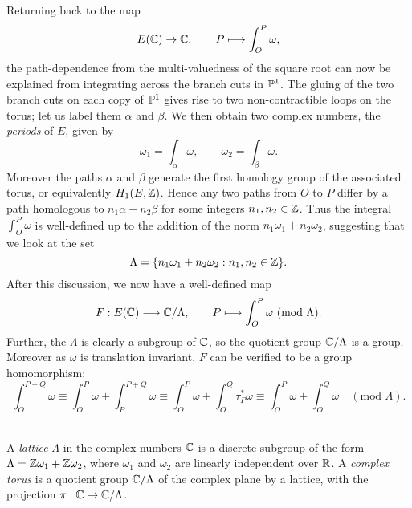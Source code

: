 Returning back to the map
\begin{equation*}
E(\mathbb{C}) \rightarrow \mathbb{C},\qquad P \longmapsto \int_{O}^{P}\omega,
\end{equation*}
the path-dependence from the multi-valuedness of the square root can now be explained from integrating across the branch cuts in $\mathbb{P}^{1}$. The gluing of the two branch cuts on each copy of $\mathbb{P}^{1}$ gives rise to two non-contractible loops on the torus; let us label them $\alpha$ and $\beta$. We then obtain two complex numbers, the \emph{periods} of $E$, given by
\begin{equation*}
	\omega_{1} = \int_{\alpha}\omega,\qquad \omega_{2} = \int_{\beta}\omega.
\end{equation*}
Moreover the paths $\alpha$ and $\beta$ generate the first homology group of the associated torus, or equivalently $H_{1}(E,\mathbb{Z})$. Hence any two paths from $O$ to $P$ differ by a path homologous to $n_{1}\alpha + n_{2}\beta$ for some integers $n_{1}, n_{2}\in \mathbb{Z}$. Thus the integral $\int_{O}^{P}\omega$ is well-defined up to the addition of the norm $n_{1}\omega_{1} + n_{2}\omega_{2}$, suggesting that we look at the set
\begin{equation*}
	\Lambda = \{n_{1}\omega_{1} + n_{2}\omega_{2}: n_{1}, n_{2}\in \mathbb{Z}\}.
\end{equation*}
After this discussion, we now have a well-defined map
\begin{equation*}
	F: E(\mathbb{C}) \longrightarrow \mathbb{C}/\Lambda,\qquad P \longmapsto \int_{O}^{P}\omega\ (\text{mod }\Lambda).
\end{equation*}
Further, the $\Lambda$ is clearly a subgroup of $\mathbb{C}$, so the quotient group $\mathbb{C}/\Lambda$ is a group. Moreover as $\omega$ is translation invariant, $F$ can be verified to be a group homomorphism:\\
\begin{equation*}
	\int_{O}^{P+Q}\omega \equiv \int_{O}^{P}\omega + \int_{P}^{P+Q}\omega \equiv \int_{O}^{P}\omega + \int_{O}^{Q}\tau_{P}^{\ast}\omega \equiv \int_{O}^{P}\omega + \int_{O}^{Q}\omega\quad(\text{mod }\Lambda).
\end{equation*}
\\
\begin{defn}
	A \emph{lattice} $\Lambda$ in the complex numbers $\mathbb{C}$ is a discrete subgroup of the form $\Lambda = \mathbb{Z}\omega_{1} + \mathbb{Z} \omega_{2}$, where $\omega_{1}$ and $\omega_{2}$ are linearly independent over $\mathbb{R}$. A \emph{complex torus} is a quotient group $\mathbb{C}/\Lambda$ of the complex plane by a lattice, with the projection $\pi:\mathbb{C} \rightarrow \mathbb{C}/\Lambda$.
\end{defn}

